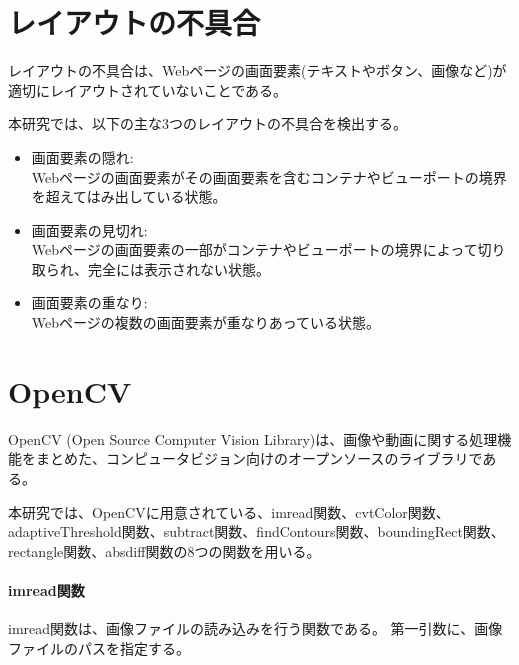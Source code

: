 \section{レイアウトの不具合}\label{sec:layout effect}
レイアウトの不具合は、Webページの画面要素(テキストやボタン、画像など)が適切にレイアウトされていないことである。
\par
本研究では、以下の主な3つのレイアウトの不具合を検出する。
\begin{itemize}
      \setlength{\itemsep}{0pt}
            \setlength{\parsep}{0pt}
      \item 画面要素の隠れ:\\
            Webページの画面要素がその画面要素を含むコンテナやビューポートの境界を超えてはみ出している状態。
      \item 画面要素の見切れ:\\
            Webページの画面要素の一部がコンテナやビューポートの境界によって切り取られ、完全には表示されない状態。
      \item 画面要素の重なり:\\
            Webページの複数の画面要素が重なりあっている状態。
\end{itemize}

\section{OpenCV}\label{sec:opencv}
OpenCV (Open Source Computer Vision Library)\cite{OpenCV}は、画像や動画に関する処理機能をまとめた、コンピュータビジョン向けのオープンソースのライブラリである。
\par
本研究では、OpenCVに用意されている、imread関数、cvtColor関数、adaptiveThreshold関数、subtract関数、findContours関数、boundingRect関数、rectangle関数、absdiff関数の8つの関数を用いる。
\paragraph{imread関数}
imread関数は、画像ファイルの読み込みを行う関数である。
第一引数に、画像ファイルのパスを指定する。
